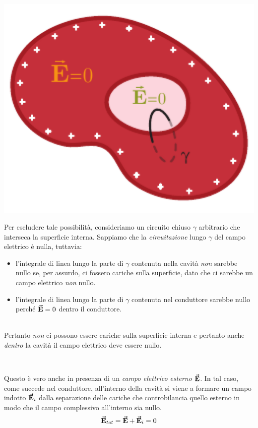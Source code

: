 \begin{demonstration}
\begin{minipage}{0.35\textwidth}
	\begin{center}
		\includegraphics[width=1\textwidth]{images/chp4condcavodim2.pdf}
	\end{center}
\end{minipage}\hspace{5pt}
\begin{minipage}{0.64\textwidth}
	Per escludere tale possibilità, consideriamo un circuito chiuso $\gamma$ arbitrario che interseca la superficie interna.
	Sappiamo che la \textit{circuitazione} lungo $\gamma$ del campo elettrico è nulla, tuttavia:
	\begin{itemize}
		\item l'integrale di linea lungo la parte di $\gamma$ contenuta nella cavità \textit{non} sarebbe nullo se, per assurdo, ci fossero cariche sulla superficie, dato che ci sarebbe un campo elettrico \textit{non} nullo.
		\item l'integrale di linea lungo la parte di $\gamma$ contenuta nel conduttore sarebbe nullo perché $\vb*{\va{E}}=0$ dentro il conduttore.
	\end{itemize}
\end{minipage}\\
Pertanto \textit{non} ci possono essere cariche sulla superficie interna e pertanto anche \textit{dentro} la cavità il campo elettrico deve essere nullo.
\end{demonstration}~\\
\begin{minipage}{0.56\textwidth}%
Questo è vero anche in presenza di un \textit{campo elettrico esterno} $\vb*{\va{E}}$. In tal caso, come succede nel conduttore, all'interno della cavità si viene a formare un campo indotto $\vb*{\va{E}}_i$ dalla separazione delle cariche  che controbilancia quello esterno in modo che il campo complessivo all'interno sia nullo.
\begin{equation*}
	\vb*{\va{E}}_{tot}=\vb*{\va{E}}+\vb*{\va{E}}_i=0
\end{equation*}
\end{minipage}
